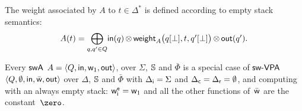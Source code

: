 %

\noindent
The weight associated by $A$ to $t \in \Delta^*$
is defined according to empty stack semantics:
%
\begin{equation}
A(t)  =
{\displaystyle\bigoplus_{q, q' \in Q}} \textstyle
\mathsf{in}(q) \mathop{\otimes}
\mathsf{weight}_A\bigl(q[{\bot}], t, q'[{\bot}]\bigr)
\mathop{\otimes} \mathsf{out}(q').
\label{eq:SWVPA-value}
\end{equation}

\noindent
Every $\textsf{swA}$ $A = \< Q, \init, {\wei_1}, \final >$,
over $\Sigma$, $\mathbb{S}$ and $\bar\Phi$
is a special case of $\textsf{sw-VPA}$
$\< Q, \emptyset, \init, \bar\wei, \final >$
over $\Delta$, $\mathbb{S}$ and $\bar\Phi$
with ${\Delta_\mathsf{i}} = \Sigma$ and ${\Delta_\mathsf{c}} = {\Delta_\mathsf{r}} = \emptyset$,
and computing with an always empty stack:
$\weiei = \wei_1$ and all the other functions
of~$\bar{\mathsf{w}}$ are the constant~$\zero$.

